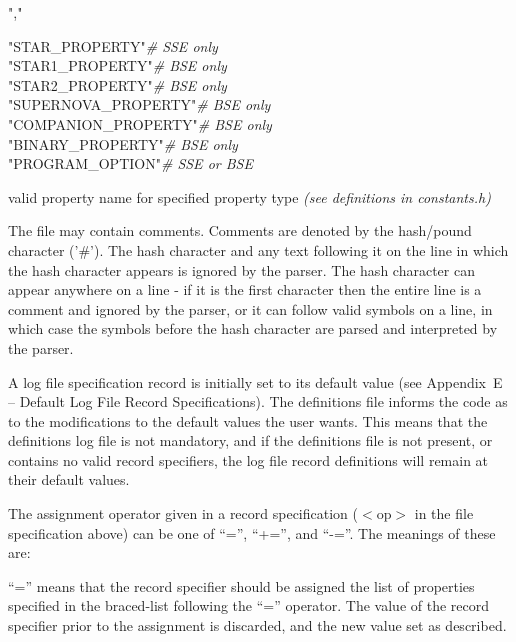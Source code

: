 \begin{minipage}{\dimexpr\textwidth-2em}
    \rab\tabto{7em}{::=}\tabto{9em}","\ \ \textbar\ \ \rab

    \rab\tabto{7em}{::=}\tabto{9em}"STAR\_PROPERTY"\tabto{23em}\textbar\tabto{28em}\textit{\# SSE only} \\
    \tabto{9em}"STAR1\_PROPERTY"\tabto{23em}\textbar\tabto{28em}\textit{\# BSE only} \\
    \tabto{9em}"STAR2\_PROPERTY"\tabto{23em}\textbar\tabto{28em}\textit{\# BSE only} \\
    \tabto{9em}"SUPERNOVA\_PROPERTY"\tabto{23em}\textbar\tabto{28em}\textit{\# BSE only} \\
    \tabto{9em}"COMPANION\_PROPERTY"\tabto{23em}\textbar\tabto{28em}\textit{\# BSE only} \\
    \tabto{9em}"BINARY\_PROPERTY"\tabto{23em}\textbar\tabto{28em}\textit{\# BSE only} \\
    \tabto{9em}"PROGRAM\_OPTION"\tabto{23em}\textbar\tabto{28em}\textit{\# SSE or BSE}

    \rab\tabto{7em}{::=}\tabto{9em}valid property name for specified property type \textit{(see definitions in constants.h)}
\end{minipage}

\newpage
The file may contain comments. Comments are denoted by the hash/pound character ('\#'). The hash character and any text following it on the line in which the hash character appears is ignored by the parser. The hash character can appear anywhere on a line - if it is the first character then the entire line is a comment and ignored by the parser, or it can follow valid symbols on a line, in which case the symbols before the hash character are parsed and interpreted by the parser.

A log file specification record is initially set to its default value (see Appendix~E -- Default Log File Record Specifications). The definitions file informs the code as to the modifications to the default values the user wants. This means that the definitions log file is not mandatory, and if the definitions file is not present, or contains no valid record specifiers, the log file record definitions will remain at their default values.

The assignment operator given in a record specification ($\mathrm{<}$op$\mathrm{>}$ in the file specification above) can be one of ``='', ``+='', and ``-=''.  The meanings of these are:

\bigskip
\hfill
\begin{minipage}{\dimexpr\textwidth-1.5cm}
``='' means that the record specifier should be assigned the list of properties specified in the braced-list following the ``='' operator. The value of the record specifier prior to the assignment is discarded, and the new value set as described.
\end{minipage}

